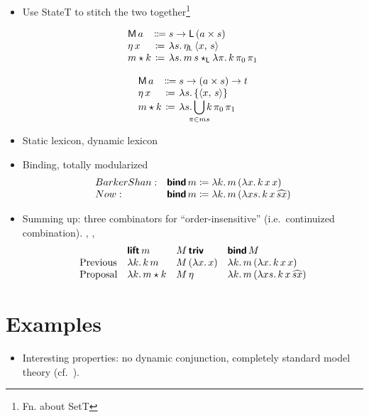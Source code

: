 \begin{itemize}
	\item Use StateT to stitch the two together\footnote{Fn. about SetT}
	\begin{defi}\label{statet}
		\[\begin{array}[t]
			{@{}l@{}c@{}l@{}}
			\textsf{M}\,a &{}\Coloneqq{} &s \ra \textsf{L}\,(a \times s)%
			\\
			\eta\,x &{}\ceq{} &\lambda s .\,\eta_\textsf{L}\,\ab{x,\,s}
			\\
			m \star k &{}\ceq{} &\lambda s.\, m\,s\star_\textsf{L} \lambda \pi.\,k\,\pi_0\,\pi_1%
		\end{array}\]
	\end{defi}
	\begin{defi}\label{stateset}
		\[\begin{array}[t]
			{@{}l@{}c@{}l@{}}
			\textsf{M}\,a &{}\Coloneqq{} &s \ra (a \times s) \ra t%
			\\
			\eta\,x &{}\ceq{} &\lambda s.\left\{\ab{x,\,s}\right\}
			\\
			m \star k &{}\ceq{} &\lambda s.\displaystyle\bigcup_{\mathclap{\pi\in ms}}k\,\pi_0\,\pi_1%
		\end{array}\]
	\end{defi}
	

	\item Static lexicon, dynamic lexicon
	
	\item Binding, totally modularized
	\[\begin{array}{ll}
		BarkerShan:& \bsf{bind}\,m \ceq \lambda k.\,m\,(\lambda x.\,k\,x\,x)
		\\
		Now:& \bsf{bind}\,m \ceq \lambda k.\,m\,(\lambda xs.\,k\,x\,\widehat{sx})%
	\end{array}\]
	
	\item Summing up: three combinators for ``order-insensitive'' (i.e.~continuized combination). , , %
	\[\begin{array}{lllll}
		& \bsf{lift}\,m & M\,\bsf{triv} & \bsf{bind}\,M %
		\\
		\text{Previous} & \lambda k.\,k\,m & M\,(\lambda x.\,x) & \lambda k.\,m\,(\lambda x.\,k\,x\,x)%
		\\
		\text{Proposal} & \lambda k.\,m \star k & M\,\eta & \lambda k.\,m\,(\lambda xs.\,k\,x\,\widehat{sx})%
	\end{array}\]
\end{itemize}

\section{Examples}
\begin{itemize}
	\item Interesting properties: no dynamic conjunction, completely standard model theory (cf.~\citealt{Groote:2006}). %
\end{itemize}

\citealt{Groote:2001}
\citealt{Charlow:diss}
\citealt{Bumford:inc}

{\small}

